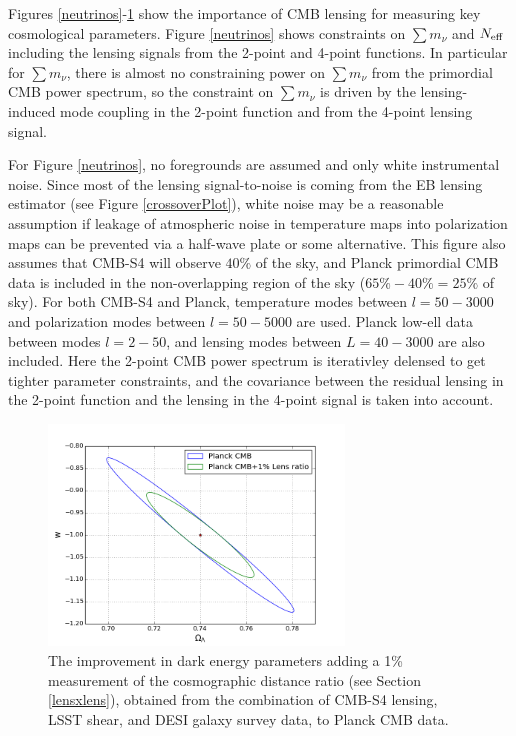 Figures \ref{neutrinos}-\ref{darkEnergy} show the importance of CMB lensing for measuring key cosmological parameters.  Figure \ref{neutrinos} shows constraints on $\sum {m_\nu}$ and $N_{\rm{eff}}$ including the lensing signals from the 2-point and 4-point functions.  In particular for $\sum {m_\nu}$, there is almost no constraining power on $\sum {m_\nu}$ from the primordial CMB power spectrum, so the constraint on $\sum {m_\nu}$ is driven by the lensing-induced mode coupling in the 2-point function and from the 4-point lensing signal.  

For Figure \ref{neutrinos}, no foregrounds are assumed and only white instrumental noise.  Since most of the lensing signal-to-noise is coming from the EB lensing estimator (see Figure \ref{crossoverPlot}), white noise may be a reasonable assumption if leakage of atmospheric noise in temperature maps into polarization maps can be prevented via a half-wave plate or some alternative.  This figure also assumes that CMB-S4 will observe $40\%$ of the sky, and Planck primordial CMB data is included in the non-overlapping region of the sky ($65\% - 40\% = 25\%$ of sky).  For both CMB-S4 and Planck, temperature modes between $l=50-3000$ and polarization modes between $l=50-5000$ are used.  Planck low-ell data between modes $l=2-50$, and lensing modes between $L=40-3000$ are also included.  Here the 2-point CMB power spectrum is iterativley delensed to get tighter parameter constraints, and the covariance between the residual lensing in the 2-point function and the lensing in the 4-point signal is taken into account.     

\begin{figure}[htbp]
\centering
\includegraphics[width=0.7\textwidth]{CMBLensing/Das_confEllipse_omL_w_1sigma.png}
\caption{The improvement in dark energy parameters adding a 1\% measurement of the cosmographic distance ratio (see Section \ref{lensxlens}), obtained from the combination of CMB-S4 lensing, LSST shear, and DESI galaxy survey data, to Planck CMB data.}
\label{darkEnergy}
\end{figure}


